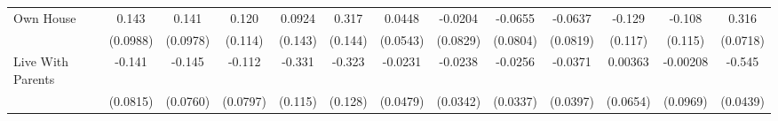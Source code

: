 {\begin{tabular}{l*{12}{c}}
\addlinespace
Own House   &       0.143         &       0.141         &       0.120         &      0.0924         &       0.317\sym{*}  &      0.0448         &     -0.0204         &     -0.0655         &     -0.0637         &      -0.129         &      -0.108         &       0.316\sym{***}\\
            &    (0.0988)         &    (0.0978)         &     (0.114)         &     (0.143)         &     (0.144)         &    (0.0543)         &    (0.0829)         &    (0.0804)         &    (0.0819)         &     (0.117)         &     (0.115)         &    (0.0718)         \\
\addlinespace
Live With Parents&      -0.141         &      -0.145         &      -0.112         &      -0.331\sym{**} &      -0.323\sym{*}  &     -0.0231         &     -0.0238         &     -0.0256         &     -0.0371         &     0.00363         &    -0.00208         &      -0.545\sym{***}\\
            &    (0.0815)         &    (0.0760)         &    (0.0797)         &     (0.115)         &     (0.128)         &    (0.0479)         &    (0.0342)         &    (0.0337)         &    (0.0397)         &    (0.0654)         &    (0.0969)         &    (0.0439)         \\
\bottomrule
\end{tabular}
}
